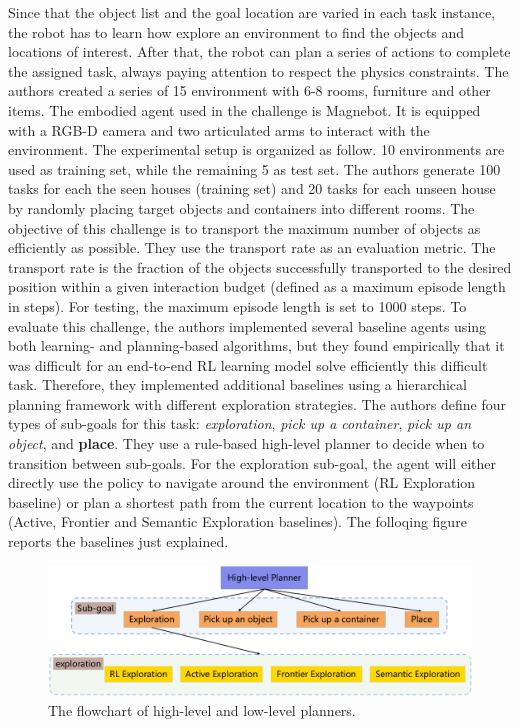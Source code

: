 Since that the object list and the goal location are varied in each task instance, the robot has to learn how explore an environment to find the objects and locations of interest. After that, the robot can plan a series of actions to complete the assigned task, 
always paying attention to respect the physics constraints. The authors created a series of 15 environment with 6-8 rooms, furniture and other items. The embodied agent used in the challenge is Magnebot. It is equipped with a RGB-D camera and two articulated arms to interact with the environment. The experimental setup is organized as follow. 10 environments are used as training set, while the remaining 5 as test set. The authors generate 100 tasks for each the seen houses (training set) and 20 tasks for each unseen house by randomly
placing target objects and containers into different rooms. The objective of this challenge is to
transport the maximum number of objects as efficiently as
possible. They use the transport rate as an evaluation metric.
The transport rate is the fraction of the objects successfully
transported to the desired position within a given interaction
budget (defined as a maximum episode length in steps). For
testing, the maximum episode length is set to 1000 steps.
To evaluate this challenge, the authors implemented several baseline agents using both
learning- and planning-based algorithms, but they found empirically that it was difficult for an end-to-end RL learning model solve efficiently this difficult task. Therefore, they
implemented additional baselines using a hierarchical planning framework with different exploration strategies. The authors define four types of sub-goals
for this task: \textit{exploration}, \textit{pick up a container}, \textit{pick up an
object}, and \textbf{place}. They use a rule-based high-level planner to
decide when to transition between sub-goals. For the exploration sub-goal, the agent will either directly use the policy
to navigate around the environment (RL Exploration baseline) or plan a shortest path from the current location to the
waypoints (Active, Frontier and Semantic Exploration baselines). The folloqing figure reports the baselines just explained. 

\begin{figure}[h!]
	\centering
	\includegraphics[width=0.9\linewidth]{images/baselines.png}
	\caption{The flowchart of high-level and low-level planners.}
\end{figure} 